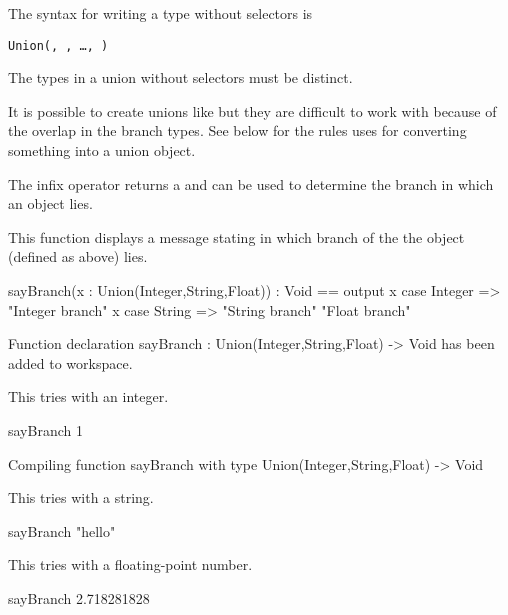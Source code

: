\beginImportant
The syntax for writing a  type without selectors is
\begin{center}
{\tt Union(, , \ldots, )}
\end{center}
The types in a union without selectors must be distinct.
\endImportant

It is possible to create unions like
 but they are
difficult to work with because of the overlap in the branch
types.
See below for the rules \Language{} uses for converting something
into a union object.

The  infix
operator returns a 
and can be used to determine the branch in which an object lies.

\begin{xtc}
\begin{xtccomment}
This function displays a message stating in which
branch of the  the object (defined as 
above) lies.
\end{xtccomment}
\begin{spadsrc}
sayBranch(x : Union(Integer,String,Float)) : Void  ==
  output
    x case Integer => "Integer branch"
    x case String  => "String branch"
    "Float branch"
\end{spadsrc}
\begin{MessageOutput}
   Function declaration sayBranch : Union(Integer,String,Float) -> Void
      has been added to workspace.
\end{MessageOutput}
\end{xtc}
%
\begin{xtc}
\begin{xtccomment}
This tries  with an integer.
\end{xtccomment}
\begin{spadsrc}
sayBranch 1 
\end{spadsrc}
\begin{MessageOutput}
   Compiling function sayBranch with type Union(Integer,String,Float)
       -> Void 
\end{MessageOutput}
\end{xtc}
\begin{xtc}
\begin{xtccomment}
This tries  with a string.
\end{xtccomment}
\begin{spadsrc}
sayBranch "hello" 
\end{spadsrc}
\end{xtc}
\begin{xtc}
\begin{xtccomment}
This tries  with a floating-point number.
\end{xtccomment}
\begin{spadsrc}
sayBranch 2.718281828 
\end{spadsrc}
\end{xtc}
%

